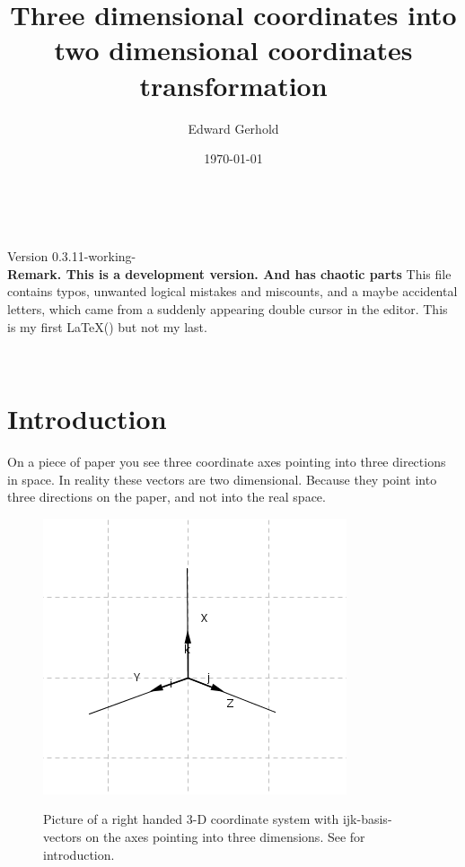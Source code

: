 \documentclass[a4paper]{article}
\begin{document}
\begin{center}
\title{Three dimensional coordinates into two dimensional coordinates transformation}\\
\author{Edward Gerhold}
\date{\today}
\maketitle


Version 0.3.11-working-\\

\textbf{Remark. This is a development version. And has chaotic parts} This file contains typos, unwanted logical mistakes and miscounts, and a maybe accidental letters, which came from a suddenly appearing double cursor in the editor. This is my first \LaTeX() but not my last.\\


\end{center} 

\tableofcontents\\

\section{Introduction}

On a piece of paper you see three coordinate axes pointing into three
directions in space. In reality these vectors are two dimensional. Because
they point into three directions on the paper, and not into the real space.\\

\begin{figure}[ht]
\label{ijksystem}
\includegraphics[scale=2]{ijksystem.png}\\
\caption{Picture of a right handed 3-D coordinate system with ijk-basis-vectors on the axes pointing
into three dimensions. See \cite{Corral1} for introduction.}
\end{figure}
\end{document}
